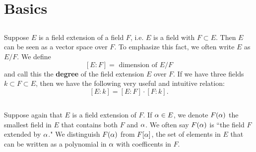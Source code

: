 \section{Basics}
\subsection{}
Suppose $E$ is a field extension of a field $F$, i.e. $E$ is a field with $F \subset E$. Then $E$ can be seen as a vector space over $F$. To emphasize this fact, we often write $E$ as $E/F$. We define
\[
    [E : F] = \text{ dimension of } E/F
\]
and call this the \textbf{degree} of the field extension $E$ over $F$. If we have three fields $k \subset F \subset E$, then we have the following very useful and intuitive relation:
\[
    [E : k] = [E : F] \cdot [F : k].
\]

\subsection{}
Suppose again that $E$ is a field extension of $F$. If $\alpha \in E$, we denote $F(\alpha)$ the smallest field in $E$ that contains both $F$ and $\alpha$. We often say $F(\alpha)$ is ``the field $F$ extended by $\alpha$." We distinguish $F(\alpha)$ from $F[\alpha]$, the set of elements in $E$ that can be written as a polynomial in $\alpha$ with coefficents in $F$.
